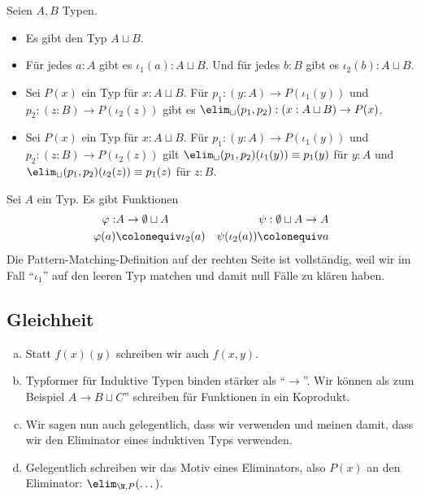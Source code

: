 \begin{regeln}
Seien $A,B$ Typen.
\begin{itemize}
\item Es gibt den Typ $A\sqcup B$.
\item Für jedes $a:A$ gibt es $\iota_1(a):A\sqcup B$.
  Und für jedes $b:B$ gibt es $\iota_2(b):A\sqcup B$.
\item Sei $P(x)$ ein Typ für $x:A\sqcup B$.
  Für $p_1:(y:A)\to P(\iota_1(y))$ und $p_2:(z:B)\to P(\iota_2(z))$
  gibt es $\elim_\sqcup(p_1,p_2):(x:A\sqcup B)\to P(x)$.
\item Sei $P(x)$ ein Typ für $x:A\sqcup B$.
  Für $p_1:(y:A)\to P(\iota_1(y))$ und $p_2:(z:B)\to P(\iota_2(z))$
  gilt $\elim_\sqcup(p_1,p_2)(\iota_1(y))\equiv p_1(y)$ für $y:A$
  und  $\elim_\sqcup(p_1,p_2)(\iota_2(z))\equiv p_1(z)$ für $z:B$.
\end{itemize}
\end{regeln}

\begin{bemerkung}
Sei $A$ ein Typ. Es gibt Funktionen
  \begin{align*}
    \varphi: &A\to \emptyset\sqcup A &\psi:\emptyset\sqcup A \to A \\
    \varphi(a)&\colonequiv \iota_2(a) &\psi(\iota_2(a))\colonequiv a 
\end{align*}
Die Pattern-Matching-Definition auf der rechten Seite ist vollständig, weil wir im Fall ``$\iota_1$'' auf den leeren Typ matchen und damit null Fälle zu klären haben.
\end{bemerkung}

\subsection{Gleichheit}
\begin{konvention}
\begin{enumerate}[(a)]
\item Statt $f(x)(y)$ schreiben wir auch $f(x,y)$.
\item Typformer für Induktive Typen binden stärker als ``$\to$''. Wir können als zum Beispiel $A\to B\sqcup C$'' schreiben für Funktionen in ein Koprodukt.
\item Wir sagen nun auch gelegentlich, dass wir  verwenden und meinen damit, dass wir den Eliminator eines induktiven Typs verwenden.
\item Gelegentlich schreiben wir das Motiv eines Eliminators, also $P(x)$ an den Eliminator: $\elim_{\N,P}(\dots)$.
\end{enumerate}
\end{konvention}

